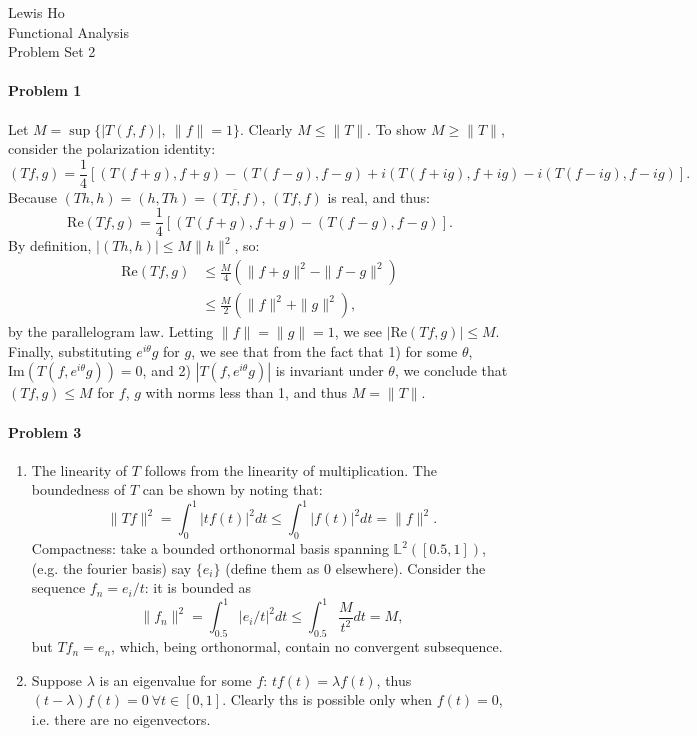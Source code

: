 \documentclass[12pt]{article}
\begin{document}
\begin{center}
  Lewis Ho\\
  Functional Analysis\\
  Problem Set 2
\end{center}

\paragraph{Problem 1}
Let $M = \sup\{|T(f,f)|,\ \|f\| = 1\}$. Clearly $M \leq \|T\|$. To show $M \geq
\|T\|$, consider the polarization identity:
\begin{displaymath}
  (Tf, g) = \frac{1}{4}[(T(f+g),f+g)-(T(f-g),f-g)+i(T(f+ig),f+ig)-i(T(f-ig),
  f-ig)].
\end{displaymath}
Because $(Th,h) = (h,Th) = \overline{(Tf,f)}$, $(Tf,f)$ is real, and thus:
\begin{displaymath}
  \text{Re}(Tf,g) = \frac{1}{4}[(T(f+g),f+g)- (T(f-g),f-g)].
\end{displaymath}
By definition, $|(Th,h)|\leq M\|h\|^2$, so:
\begin{align*}
  \text{Re}(Tf,g) &\leq \frac{M}{4}(\|f+g\|^2 - \|f-g\|^2)\\
  & \leq \frac{M}{2}(\|f\|^2 + \|g\|^2),
\end{align*}
by the parallelogram law. Letting $\|f\| = \|g\| = 1$, we see $|\text{Re}(Tf,g)
| \leq M$. Finally, substituting $e^{i\theta}g$ for $g$, we see that from the fact
that 1) for some $\theta$, $\text{Im}(T(f, e^{i\theta}g)) = 0$, and 2) $|T(f, e^
{i\theta}g)|$ is invariant under $\theta$, we conclude that $(Tf, g) \leq M$ for
$f$, $g$ with norms less than 1, and thus $M = \|T\|$.

\paragraph{Problem 3}
\begin{enumerate}[label=\alph*)]
\item The linearity of $T$ follows from the linearity of multiplication. The
  boundedness of $T$ can be shown by noting that:
  \begin{displaymath}
    \|Tf\|^2 = \int_0^1|tf(t)|^2dt \leq \int_0^1|f(t)|^2dt = \|f\|^2.
  \end{displaymath}
  Compactness: take a bounded orthonormal basis spanning $\mathbb{L}^2([0.5,1])$,
  (e.g. the fourier basis) say
  $\{e_i\}$ (define them as 0 elsewhere). Consider the sequence $f_n = e_i/t$:
  it is bounded as
  \begin{displaymath}
    \|f_n\|^2 = \int_{0.5}^1|e_i/t|^2dt\leq \int_{0.5}^1\frac{M}{t^2}dt = M,
  \end{displaymath}
  but $Tf_n = e_n$, which, being orthonormal, contain no convergent subsequence.
\item Suppose $\lambda$ is an eigenvalue for some $f$: $tf(t) = \lambda f(t)$,
  thus $(t-\lambda)f(t) = 0\ \forall t \in [0,1]$. Clearly ths is possible only
  when $f(t) = 0$, i.e. there are no eigenvectors.
\end{enumerate}
\end{document}
